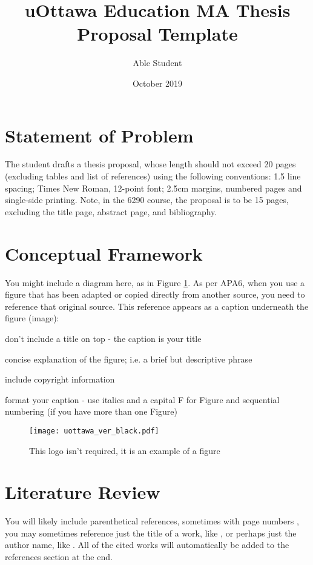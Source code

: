 \documentclass[
doc, %
biblatex, %
12pt,
draftfirst
]{apa6}
\title{uOttawa Education MA Thesis Proposal Template}
\author{Able Student}
\date{October 2019}
\affiliation{University of Ottawa}
\begin{document}
\makePropTitle

\section{Statement of Problem}
The student drafts a thesis proposal, whose length should not exceed 20 pages (excluding tables and list of references) using the following conventions: 1.5 line spacing; Times New Roman, 12-point font; 2.5cm margins, numbered pages and single-side printing. Note, in the 6290 course, the proposal is to be 15 pages, excluding the title page, abstract page, and bibliography.

\lipsum[1] %

\section{Conceptual Framework}
You might include a diagram here, as in Figure \ref{fig:logo}. As per APA6, when you use a figure that has been adapted or copied directly from another source, you need to reference that original source. This reference appears as a caption underneath the figure (image):

\begin{APAitemize}
\item don't include a title on top - the caption is your title
\item concise explanation of the figure; i.e. a brief but descriptive phrase
\item include copyright information
\item format your caption - use italics and a capital F for Figure and sequential numbering (if you have more than one Figure)
\end{APAitemize}

\begin{figure}[!ht]
\centering
\texttt{[image: uottawa\_ver\_black.pdf]}
\caption{This logo isn't required, it is an example of a figure}
\label{fig:logo}
\end{figure}

\section{Literature Review}
You will likely include parenthetical references, sometimes with page numbers \parencite[p.\,12-14]{writer2109Best}, you may sometimes reference just the title of a work, like , or perhaps just the author name, like  \citeauthor{writer2109Best}. All of the cited works will automatically be added to the references section at the end.
\end{document}
